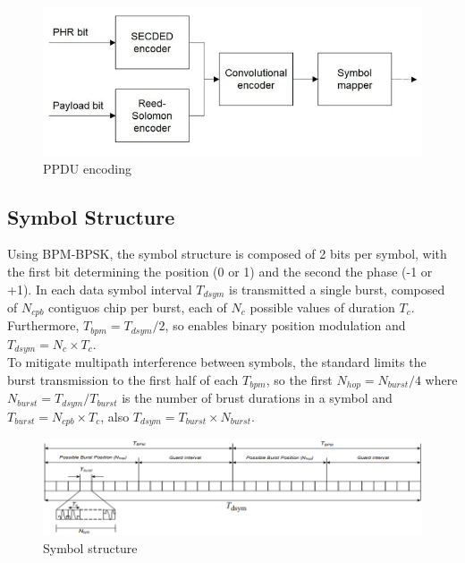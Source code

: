 \documentclass[conference]{IEEEtran}
\begin{document}
\begin{figure}[!h]
  \centering
  \includegraphics[width=\linewidth]{encoding}
  \caption{PPDU encoding}
  \label{fig:PPDU-encoding}
\end{figure}

\subsection{Symbol Structure}
Using BPM-BPSK, the symbol structure is composed of 2 bits per symbol, with the first bit
determining the position (0 or 1) and the second the phase (-1 or +1). In each data symbol
interval $T_{dsym}$ is transmitted a single burst, composed of $N_{cpb}$ contiguos chip per 
burst, each of $N_{c}$ possible values of duration $T_{c}$. Furthermore, $T_{bpm}=T_{dsym}/2$, 
so enables binary position modulation and $T_{dsym}=N_{c} \times T_{c}$.\\
To mitigate multipath interference between symbols, the standard limits the burst transmission 
to the first half of each $T_{bpm}$, so the first $N_{hop}=N_{burst}/4$ where 
$N_{burst}=T_{dsym}/T_{burst}$ is the number of brust durations in a symbol and 
$T_{burst}=N_{cpb} \times T_{c}$, also $T_{dsym}=T_{burst} \times N_{burst}$.\\

\begin{figure}[!h]
  \centering
  \includegraphics[width=\linewidth]{symbol-structure}
  \caption{Symbol structure}
  \label{fig:symbol-structure}
\end{figure}
\end{document}
